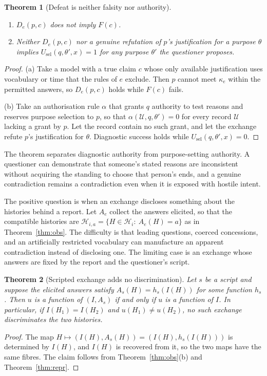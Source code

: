 \documentclass[11pt]{article}
\newtheorem{theorem}{Theorem}
\theoremstyle{definition}
\theoremstyle{remark}
\begin{document}
\begin{theorem}[Defeat is neither falsity nor authority]\label{thm:defeat}
\begin{enumerate}[label=(\alph*),leftmargin=2em,itemsep=0pt]
\item $D_e(p,c)$ does not imply $F(c)$.
\item Neither $D_e(p,c)$ nor a genuine refutation of $p$'s justification for a purpose $\theta$ implies $U_{\mathrm{sel}}(q,\theta',x)=1$ for any purpose $\theta'$ the questioner proposes.
\end{enumerate}
\end{theorem}
\begin{proof}
(a) Take a model with a true claim $c$ whose only available justification uses vocabulary or time that the rules of $e$ exclude. Then $p$ cannot meet $\kappa_e$ within the permitted answers, so $D_e(p,c)$ holds while $F(c)$ fails.

(b) Take an authorisation rule $\alpha$ that grants $q$ authority to test reasons and reserves purpose selection to $p$, so that $\alpha(\mathcal U,q,\theta')=0$ for every record $\mathcal U$ lacking a grant by $p$. Let the record contain no such grant, and let the exchange refute $p$'s justification for $\theta$. Diagnostic success holds while $U_{\mathrm{sel}}(q,\theta',x)=0$. \qedhere
\end{proof}

The theorem separates diagnostic authority from purpose-setting authority. A questioner can demonstrate that someone's stated reasons are inconsistent without acquiring the standing to choose that person's ends, and a genuine contradiction remains a contradiction even when it is exposed with hostile intent.

The positive question is when an exchange discloses something about the histories behind a report. Let $A_e$ collect the answers elicited, so that the compatible histories are $\mathcal H_{i,a}=\{H\in\mathcal H_i:\ A_e(H)=a\}$ as in Theorem~\ref{thm:obs}. The difficulty is that leading questions, coerced concessions, and an artificially restricted vocabulary can manufacture an apparent contradiction instead of disclosing one. The limiting case is an exchange whose answers are fixed by the report and the questioner's script.

\begin{theorem}[Scripted exchange adds no discrimination]\label{thm:script}
Let $s$ be a script and suppose the elicited answers satisfy $A_s(H)=h_s(I(H))$ for some function $h_s$. Then $u$ is a function of $(I,A_s)$ if and only if $u$ is a function of $I$. In particular, if $I(H_1)=I(H_2)$ and $u(H_1)\neq u(H_2)$, no such exchange discriminates the two histories.
\end{theorem}
\begin{proof}
The map $H\mapsto(I(H),A_s(H))=(I(H),h_s(I(H)))$ is determined by $I(H)$, and $I(H)$ is recovered from it, so the two maps have the same fibres. The claim follows from Theorem~\ref{thm:obs}(b) and Theorem~\ref{thm:repr}. \qedhere
\end{proof}
\end{document}
